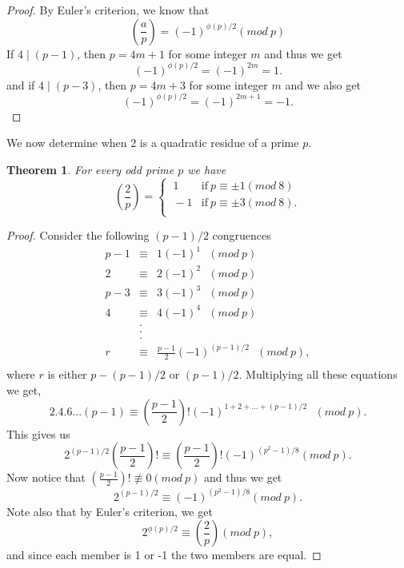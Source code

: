 \documentclass[12pt,letterpaper]{book}
\newtheorem{theorem}{Theorem}
\begin{document}
\begin{proof}
By Euler's criterion, we know that
\begin{equation*}
\left(\frac{a}{p}\right)=(-1)^{\phi(p)/2}(mod \ p)
\end{equation*}
If $4\mid (p-1)$, then $p=4m+1$ for some integer $m$ and thus we get
\begin{equation*}
(-1)^{\phi(p)/2}=(-1)^{2m}=1.
\end{equation*}
and if $4\mid (p-3)$, then $p=4m+3$ for some integer $m$ and we also
get
\begin{equation*}
(-1)^{\phi(p)/2}=(-1)^{2m+1}=-1.
\end{equation*}
\end{proof}

We now determine when $2$ is a quadratic residue of a prime $p$.

\begin{theorem}
For every odd prime $p$ we have
\[\left(\frac{2}{p}\right)=\left\{\begin{array}{lcr}
\ 1  &{\mbox{if}\  p\equiv \pm1(mod \ 8)} \\
\ -1  &{\mbox{if}\  p\equiv \pm 3(mod \ 8)}. \\
\end{array}\right .\]
\end{theorem}

\begin{proof}
Consider the following $(p-1)/2$ congruences
\begin{eqnarray*}
p-1&\equiv& 1(-1)^1 \ \ \ (mod \ p)\\
2&\equiv& 2(-1)^2 \ \ \ (mod \ p)\\
p-3&\equiv& 3(-1)^3 \ \ \  (mod \ p)\\
4&\equiv& 4(-1)^4 \ \ \ (mod \ p)\\
&.& \\
&.& \\
&.& \\
r&\equiv& \frac{p-1}{2}(-1)^{(p-1)/2} \ \ \ (mod \ p),\\
\end{eqnarray*}
where $r$ is either $p-(p-1)/2$ or $(p-1)/2$.  Multiplying all these
equations we get,
\begin{equation*}
2.4.6...(p-1)\equiv
\left(\frac{p-1}{2}\right)!(-1)^{1+2+...+(p-1)/2} \ \ \ (mod \ p).
\end{equation*}
This gives us
\begin{equation*}
2^{(p-1)/2}\left(\frac{p-1}{2}\right)! \equiv
\left(\frac{p-1}{2}\right)!(-1)^{(p^2-1)/8} (mod \ p).
\end{equation*}
Now notice that $\left(\frac{p-1}{2}\right)!\not\equiv 0(mod \ p)$
and thus we get
\begin{equation*}
2^{(p-1)/2}\equiv (-1)^{(p^2-1)/8}(mod \ p).
\end{equation*}
Note also that by Euler's criterion, we get
\begin{equation*}
2^{\phi(p)/2}\equiv \left(\frac{2}{p}\right)(mod \ p),
\end{equation*}
and since each member is 1 or -1 the two members are equal.
\end{proof}
\end{document}

